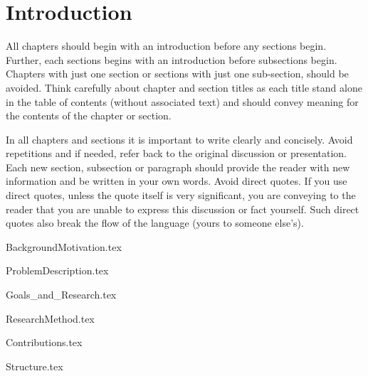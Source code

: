 \chapter{Introduction}
\label{cha:Introduction}



All chapters should begin with an introduction before any sections begin. Further, each sections begins with an introduction before  subsections begin. Chapters with just one section or sections with just one sub-section, should be avoided. Think carefully about chapter and section titles as each title stand alone in the table of contents (without associated text) and should convey meaning for the contents of the chapter or section. 

In all chapters and sections it is important to write clearly and concisely. Avoid repetitions and if needed, refer back to the original discussion or presentation. Each new section, subsection or paragraph should provide the reader with new information and be written in your own words. Avoid direct quotes. If you use direct quotes, unless the quote itself is very significant, you are conveying to the reader that you are unable to express this discussion or fact yourself. Such direct quotes also break the flow of the language (yours to someone else's).   

{BackgroundMotivation.tex}

{ProblemDescription.tex}

{Goals_and_Research.tex}

{ResearchMethod.tex}

{Contributions.tex}

{Structure.tex}
